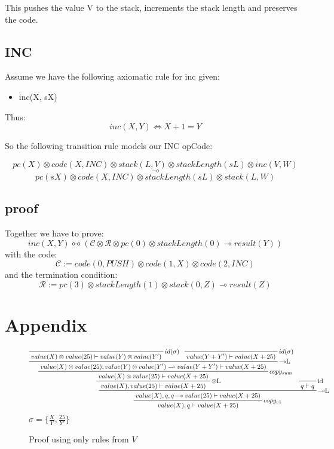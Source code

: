 \documentclass[sigconf]{acmart}
\begin{document}
This pushes the value V to the stack, increments the stack length and preserves the code.

\subsection*{INC}

Assume we have the following axiomatic rule for inc given:

\begin{itemize}
  \item inc(X, sX)
\end{itemize}

Thus:
  $$ inc(X, Y) \Leftrightarrow X + 1 = Y$$


So the following transition rule models our INC opCode:

  $$pc(X) \otimes code(X, INC) \otimes stack(L, V) \otimes stackLength(sL) \otimes inc(V, W)$$
  $$\multimap$$
  $$pc(sX) \otimes code(X, INC) \otimes stackLength(sL) \otimes stack(L, W)$$


\subsection*{proof}

Together we have to prove:
\[ inc(X,Y) \multimapboth (\mathcal{C}\otimes \mathcal{R}\otimes pc(0)\otimes stackLength(0) \multimap result(Y)) \]
with the code:
\[ \mathcal{C} := code(0, PUSH)\otimes code(1, X) \otimes code(2, INC) \]
and the termination condition:
\[ \mathcal{R} := pc(3)\otimes stackLength(1) \otimes stack(0, Z)\multimap result(Z)\]







\section{Appendix}

\begin{figure*}
\[
  \prftree[r] {$\multimap$L}
  {
    \prftree[r] {$\otimes$L}
    {
      \prftree[r] {$copy_{sum}$}
      {
        \prftree[r] {$\multimap$L}
        {
          \prftree[r] {$id(\sigma)$}
          {
            value(X)\otimes value(25)\vdash value(Y)\otimes value(Y')
          }
        }
        {
          \prftree[r] {$id(\sigma)$}
          {
            value(Y + Y')\vdash value(X + 25)
          }
        }
        {
          value(X)\otimes value(25), value(Y)\otimes value(Y')\multimap value(Y + Y')\vdash value(X + 25)
        }
      }
      { value(X)\otimes value(25)\vdash value(X + 25) }
    }
    { value(X),value(25)\vdash value(X + 25) }
  }
  {
    \prftree[r] {id}
    { q\vdash q }
  }
  { \prftree[r] {$copy_{v1}$}
    {value(X),q,q\multimap value(25)\vdash value(X + 25)}
    {value(X),q\vdash value(X + 25)}
  }
\]
$\sigma = \{\frac{X}{Y}, \frac{25}{Y'}\}$
\caption{Proof using only rules from $V$}
\label{pf1}
\end{figure*}
\end{document}
